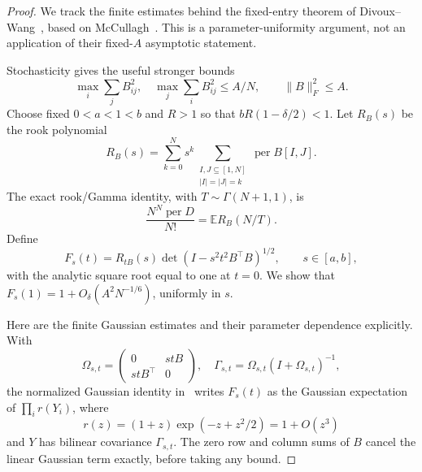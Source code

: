 \begin{proof}
We track the finite estimates behind the fixed-entry theorem
of Divoux--Wang~\cite[Section 3]{DW}, based on McCullagh~\cite{McC}.
This is a parameter-uniformity argument, not an application
of their fixed-\(A\) asymptotic statement.

Stochasticity gives the useful stronger bounds
\[
 \max_i\sum_jB_{ij}^2,\quad
 \max_j\sum_iB_{ij}^2\leq A/N,\qquad
 \|B\|_F^2\leq A.
\]
Choose fixed \(0<a<1<b\) and \(R>1\) so that
\(bR(1-\delta/2)<1\).
Let \(R_B(s)\) be the rook polynomial
\[
 R_B(s)=\sum_{k=0}^N s^k
       \sum_{\substack{I,J\subseteq[1,N]\\|I|=|J|=k}}
                         \operatorname{per}B[I,J].
\]
The exact rook/Gamma identity, with
\(T\sim\Gamma(N+1,1)\), is
\[
 \frac{N^N\operatorname{per}D}{N!}
                         =\mathbb E R_B(N/T).
\]
Define
\[
 F_s(t)=R_{tB}(s)
             \det(I-s^2t^2B^\top B)^{1/2},
 \qquad s\in[a,b],
\]
with the analytic square root equal to one at \(t=0\).
We show that \(F_s(1)=1+O_\delta(A^2N^{-1/6})\),
uniformly in \(s\).

Here are the finite Gaussian estimates and their parameter
dependence explicitly.
With
\[
 \Omega_{s,t}=\begin{pmatrix}0&stB\\stB^\top&0\end{pmatrix},
 \quad
 \Gamma_{s,t}=\Omega_{s,t}(I+\Omega_{s,t})^{-1},
\]
the normalized Gaussian identity in~\cite[Lemmas 3.5--3.7]{DW}
writes \(F_s(t)\) as the Gaussian expectation of
\(\prod_i r(Y_i)\), where
\[
 r(z)=(1+z)\exp(-z+z^2/2)=1+O(z^3)
\]
and \(Y\) has bilinear covariance \(\Gamma_{s,t}\).
The zero row and column sums of \(B\) cancel the linear
Gaussian term exactly, before taking any bound.


\end{proof}
